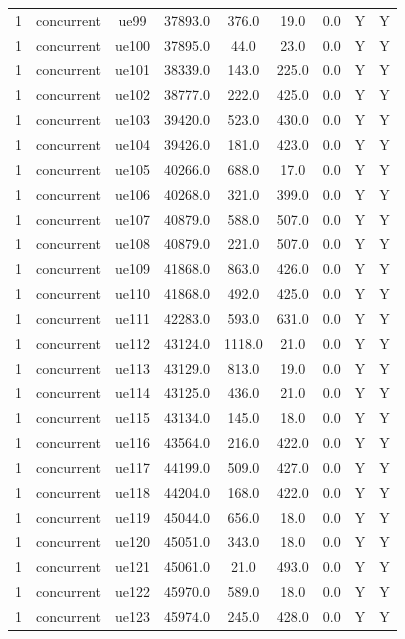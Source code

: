 \begin{table}[ht]
\begin{tabular}{|c|c|c|c|c|c|c|c|c|}
1 & concurrent & ue99 & 37893.0 & 376.0 & 19.0 & 0.0 & Y & Y \\
1 & concurrent & ue100 & 37895.0 & 44.0 & 23.0 & 0.0 & Y & Y \\
1 & concurrent & ue101 & 38339.0 & 143.0 & 225.0 & 0.0 & Y & Y \\
1 & concurrent & ue102 & 38777.0 & 222.0 & 425.0 & 0.0 & Y & Y \\
1 & concurrent & ue103 & 39420.0 & 523.0 & 430.0 & 0.0 & Y & Y \\
1 & concurrent & ue104 & 39426.0 & 181.0 & 423.0 & 0.0 & Y & Y \\
1 & concurrent & ue105 & 40266.0 & 688.0 & 17.0 & 0.0 & Y & Y \\
1 & concurrent & ue106 & 40268.0 & 321.0 & 399.0 & 0.0 & Y & Y \\
1 & concurrent & ue107 & 40879.0 & 588.0 & 507.0 & 0.0 & Y & Y \\
1 & concurrent & ue108 & 40879.0 & 221.0 & 507.0 & 0.0 & Y & Y \\
1 & concurrent & ue109 & 41868.0 & 863.0 & 426.0 & 0.0 & Y & Y \\
1 & concurrent & ue110 & 41868.0 & 492.0 & 425.0 & 0.0 & Y & Y \\
1 & concurrent & ue111 & 42283.0 & 593.0 & 631.0 & 0.0 & Y & Y \\
1 & concurrent & ue112 & 43124.0 & 1118.0 & 21.0 & 0.0 & Y & Y \\
1 & concurrent & ue113 & 43129.0 & 813.0 & 19.0 & 0.0 & Y & Y \\
1 & concurrent & ue114 & 43125.0 & 436.0 & 21.0 & 0.0 & Y & Y \\
1 & concurrent & ue115 & 43134.0 & 145.0 & 18.0 & 0.0 & Y & Y \\
1 & concurrent & ue116 & 43564.0 & 216.0 & 422.0 & 0.0 & Y & Y \\
1 & concurrent & ue117 & 44199.0 & 509.0 & 427.0 & 0.0 & Y & Y \\
1 & concurrent & ue118 & 44204.0 & 168.0 & 422.0 & 0.0 & Y & Y \\
1 & concurrent & ue119 & 45044.0 & 656.0 & 18.0 & 0.0 & Y & Y \\
1 & concurrent & ue120 & 45051.0 & 343.0 & 18.0 & 0.0 & Y & Y \\
1 & concurrent & ue121 & 45061.0 & 21.0 & 493.0 & 0.0 & Y & Y \\
1 & concurrent & ue122 & 45970.0 & 589.0 & 18.0 & 0.0 & Y & Y \\
1 & concurrent & ue123 & 45974.0 & 245.0 & 428.0 & 0.0 & Y & Y \\

\end{tabular}
\end{table}
